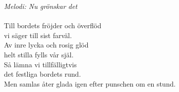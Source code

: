 {\footnotesize\textit{Melodi: Nu grönskar det}}\\
\\
Till bordets fröjder och överflöd\\
vi säger till sist farväl.\\
Av inre lycka och rosig glöd\\
helt stilla fylls vår själ.\\
Så lämna vi tillfälligtvis\\
det festliga bordets rund.\\
Men samlas åter glada igen efter punschen om en stund.
